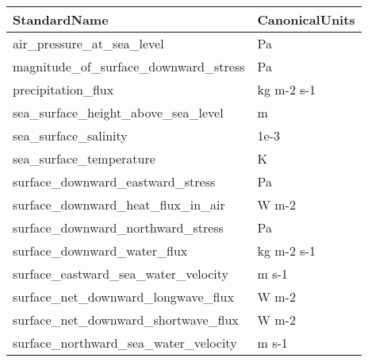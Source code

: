 
\begin{longtable}{|l|l|}
\hline \hline
   {\bf StandardName}
 & {\bf CanonicalUnits}
\\ \hline \hline

 
                             air\_pressure\_at\_sea\_level
 &                                                Pa
\\ \hline
                  magnitude\_of\_surface\_downward\_stress
 &                                                Pa
\\ \hline
                                    precipitation\_flux
 &                                        kg m-2 s-1
\\ \hline
                    sea\_surface\_height\_above\_sea\_level
 &                                                 m
\\ \hline
                                  sea\_surface\_salinity
 &                                              1e-3
\\ \hline
                               sea\_surface\_temperature
 &                                                 K
\\ \hline
                      surface\_downward\_eastward\_stress
 &                                                Pa
\\ \hline
                     surface\_downward\_heat\_flux\_in\_air
 &                                             W m-2
\\ \hline
                     surface\_downward\_northward\_stress
 &                                                Pa
\\ \hline
                           surface\_downward\_water\_flux
 &                                        kg m-2 s-1
\\ \hline
                   surface\_eastward\_sea\_water\_velocity
 &                                             m s-1
\\ \hline
                    surface\_net\_downward\_longwave\_flux
 &                                             W m-2
\\ \hline
                   surface\_net\_downward\_shortwave\_flux
 &                                             W m-2
\\ \hline
                  surface\_northward\_sea\_water\_velocity
 &                                             m s-1
\\ \hline
\hline
\end{longtable}
 

\setlength{\parskip}{\oldparskip}
\setlength{\parindent}{\oldparindent}
\setlength{\baselineskip}{\oldbaselineskip}
